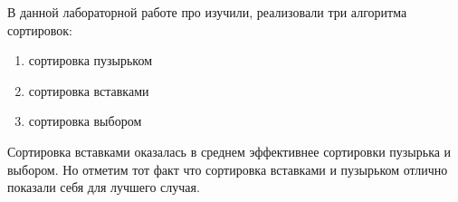 В данной лабораторной работе про изучили, реализовали три алгоритма сортировок:
\begin{enumerate}
	\item сортировка пузырьком
	\item сортировка вставками
	\item сортировка выбором
\end{enumerate}

Сортировка вставками оказалась в среднем эффективнее сортировки пузырька и выбором. Но отметим тот факт что сортировка вставками и пузырьком отлично показали себя для лучшего случая.